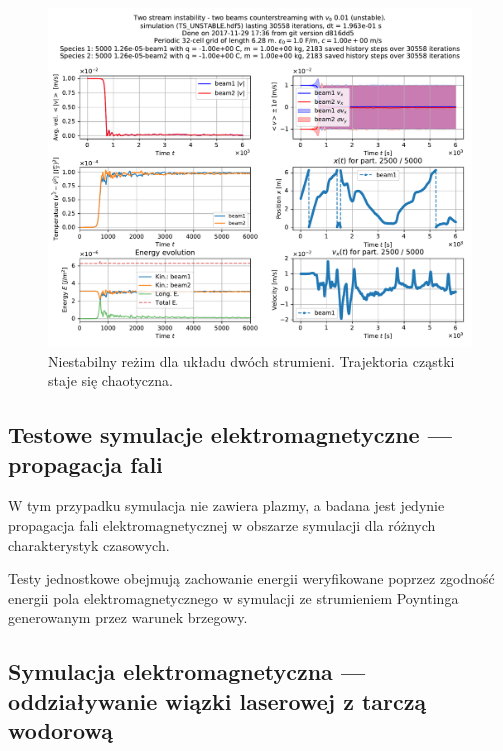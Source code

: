 \begin{figure}[h!]
  \includegraphics[width=\textwidth]{Images/TS_UNSTABLE}
  \caption{Niestabilny reżim dla układu dwóch strumieni. Trajektoria cząstki staje się chaotyczna.\label{fig:twostream-unstable}}
\end{figure}


\subsection{Testowe symulacje elektromagnetyczne --- propagacja fali}
W tym przypadku symulacja nie zawiera plazmy, a badana jest jedynie propagacja fali elektromagnetycznej w obszarze
symulacji dla różnych charakterystyk czasowych. 

Testy jednostkowe obejmują zachowanie energii weryfikowane poprzez zgodność
energii pola elektromagnetycznego w symulacji ze strumieniem Poyntinga generowanym
przez warunek brzegowy. %


\subsection{Symulacja elektromagnetyczna --- oddziaływanie wiązki laserowej z tarczą wodorową}

